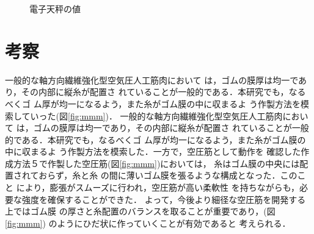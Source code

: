 \begin{figure}[h]
\begin{minipage}{0.49\columnwidth}
    \caption{電子天秤の値}
    \label{fig:138}
  \end{minipage}
\end{figure}

\newpage
\section{考察}
一般的な軸方向繊維強化型空気圧人工筋肉において
は，ゴムの膜厚は均一であり，その内部に縦糸が配置さ
れていることが一般的である．本研究でも，なるべくゴ
ム厚が均一になるよう，また糸がゴム膜の中に収まるよ
う作製方法を模索していった(図\ref{fig:mmm})．
一般的な軸方向繊維強化型空気圧人工筋肉において
は，ゴムの膜厚は均一であり，その内部に縦糸が配置さ
れていることが一般的である．本研究でも，なるべくゴ
ム厚が均一になるよう，また糸がゴム膜の中に収まるよ
う作製方法を模索した．一方で，空圧筋として動作を
確認した作成方法５で作製した空圧筋(図\ref{fig:mmm})においては，
糸はゴム膜の中央には配置されておらず，糸と糸
の間に薄いゴム膜を張るような構成となった．このこと
により，膨張がスムーズに行われ，空圧筋が高い柔軟性
を持ちながらも，必要な強度を確保することができた．
よって，今後より細径な空圧筋を開発する上ではゴム膜
の厚さと糸配置のバランスを取ることが重要であり，(図\ref{fig:mmm})
のようにひだ状に作っていくことが有効であると
考えられる．
